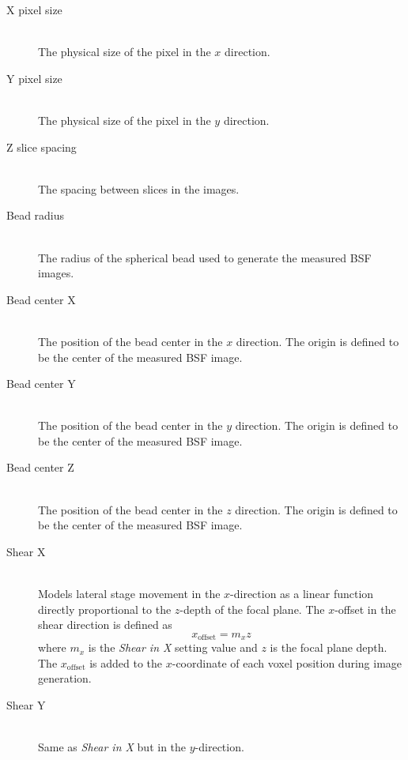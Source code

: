 \documentclass[11pt,titlepage,twoside]{article}
\begin{document}
\begin{description}

  \item[X pixel size] \hfill \\
   The physical size of the pixel in the $x$ direction.
  
  \item[Y pixel size] \hfill \\
   The physical size of the pixel in the $y$ direction.
  
  \item[Z slice spacing] \hfill \\
   The spacing between slices in the images.
  
  \item[Bead radius] \hfill \\
   The radius of the spherical bead used to generate the measured BSF images.
  
  \item[Bead center X] \hfill \\
   The position of the bead center in the $x$ direction. The origin is defined to be the center of the measured BSF image.
  
  \item[Bead center Y] \hfill \\
   The position of the bead center in the $y$ direction. The origin is defined to be the center of the measured BSF image.
  
  \item[Bead center Z] \hfill \\
   The position of the bead center in the $z$ direction. The origin is defined to be the center of the measured BSF image.
    
  \item[Shear X] \hfill \\
Models lateral stage movement in the $x$-direction as a linear function directly proportional to the $z$-depth of the focal plane. The $x$-offset in the shear direction is defined as
\begin{equation}
x_{\mathrm{offset}} = m_{x} z
\end{equation}
where $m_{x}$ is the \emph{Shear in X} setting value and $z$ is the focal plane depth. The $x_{\mathrm{offset}}$ is added to the $x$-coordinate of each voxel position during image generation.

  \item[Shear Y] \hfill \\
   Same as \emph{Shear in X} but in the $y$-direction.


\end{description}
\end{document}
